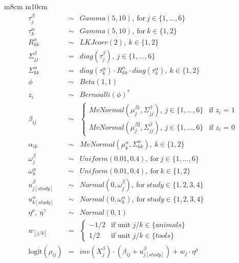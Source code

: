 \documentclass{article}
\begin{document}
\begin{tabular}{ m{8cm} m{10cm}}
\[\begin{array}{rcl}
    \tau_{j}^{\beta} & \sim & Gamma(5, 10),\ \mathrm{for}\ j \in \{1, \ldots, 6\} \\
    \tau_{k}^{\alpha} & \sim & Gamma(5, 10),\ \mathrm{for}\ k \in \{1, 2\} \\
    R_{kk}^{\alpha} & \sim & LKJcorr(2),\ k \in \{1, 2\}  \\ 
    \Sigma_{jj}^{\beta} & = & diag(\tau_{j}^{\beta}),\ j \in \{1, \ldots, 6\} \\ 
    \Sigma_{kk}^{\alpha} & = & diag(\tau_{k}^{\alpha}) \cdot R_{kk}^{\alpha} \cdot diag(\tau_{k}^{\alpha}),\ k \in \{1, 2\}  \\ 
    \phi & \sim & Beta(1,1) \\
    z_i & \sim & Bernoulli(\phi)^* \\
    \beta_{ij} & \sim & 
    \begin{cases} 
        MvNormal(\mu_j^{\beta1}, \Sigma_{jj}^{\beta}),\ j \in \{1, \ldots, 6\} & \text{if $z_i$ = 1} \\ 
        MvNormal(\mu_j^{\beta2}, \Sigma_{jj}^{\beta}),\ j \in \{1, \ldots, 6\} & \text{if $z_i$ = 0}
    \end{cases}\\ 
    \alpha_{ik} & \sim & MvNormal(\mu_k^{\alpha}, \Sigma_{kk}^{\alpha}),\ k \in \{1, 2\} \\
    \omega_{j}^{\beta} & \sim & Uniform(0.01, 0.4),\ \mathrm{for}\ j \in \{1, \ldots, 6\} \\
    \omega_{k}^{\alpha} & \sim & Uniform(0.01, 0.4),\ \mathrm{for}\ k \in \{1, 2\} \\
    u_{j[study]}^{\beta} & \sim & Normal(0, \omega_{j}^{\beta}),\ \mathrm{for}\ study \in \{1, 2, 3, 4\} \\
    u_{k[study]}^{\alpha} & \sim & Normal(0, \omega_{k}^{\alpha}),\ \mathrm{for}\ study \in \{1, 2, 3, 4\} \\
    \eta^{\rho},\ \eta^{\gamma} & \sim & Normal(0, 1) \\
    w_{[j/k]} & = & 
    \begin{cases} 
      -1/2 & \text{if unit $j/k$} \in \{animals\} \\ 
      1/2 & \text{if unit $j/k$} \in \{tools\}
    \end{cases}\\ 
    \mathrm{logit}(\rho_{ij}) & = & \mathit{inv}(X_j^{\beta}) \cdot (\beta_{ij} + u_{j[study]}^{\beta}) + w_{j} \cdot \eta^{\rho}\\ 

\end{array}\]
\end{tabular}
\end{document}
